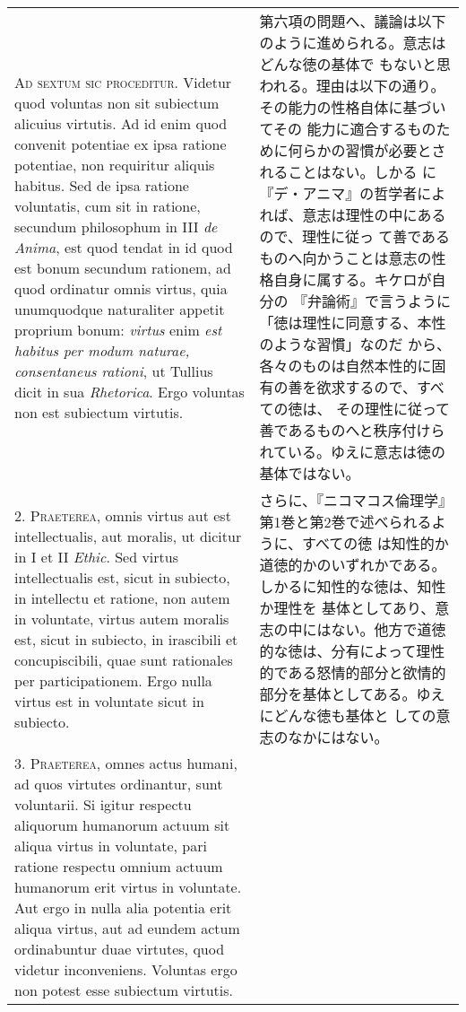 \documentclass[10pt]{jsarticle}
\begin{document}
\begin{longtable}{p{21em}p{21em}}

{\scshape Ad sextum sic proceditur}. Videtur quod voluntas non sit
subiectum alicuius virtutis. Ad id enim quod convenit potentiae ex
ipsa ratione potentiae, non requiritur aliquis habitus. Sed de ipsa
ratione voluntatis, cum sit in ratione, secundum philosophum in III
{\itshape de Anima}, est quod tendat in id quod est bonum secundum
rationem, ad quod ordinatur omnis virtus, quia unumquodque naturaliter
appetit proprium bonum: {\itshape virtus} enim {\itshape est habitus
per modum naturae, consentaneus rationi}, ut Tullius dicit in sua
{\itshape Rhetorica}. Ergo voluntas non est subiectum virtutis.


&

 第六項の問題へ、議論は以下のように進められる。意志はどんな徳の基体で
 もないと思われる。理由は以下の通り。その能力の性格自体に基づいてその
 能力に適合するものために何らかの習慣が必要とされることはない。しかる
 に『デ・アニマ』の哲学者によれば、意志は理性の中にあるので、理性に従っ
 て善であるものへ向かうことは意志の性格自身に属する。キケロが自分の
 『弁論術』で言うように「徳は理性に同意する、本性のような習慣」なのだ
 から、各々のものは自然本性的に固有の善を欲求するので、すべての徳は、
 その理性に従って善であるものへと秩序付けられている。ゆえに意志は徳の
 基体ではない。
 
\\



2. {\scshape Praeterea}, omnis virtus aut est intellectualis, aut
moralis, ut dicitur in I et II {\itshape Ethic}. Sed virtus
intellectualis est, sicut in subiecto, in intellectu et ratione, non
autem in voluntate, virtus autem moralis est, sicut in subiecto, in
irascibili et concupiscibili, quae sunt rationales per
participationem. Ergo nulla virtus est in voluntate sicut in subiecto.


&

さらに、『ニコマコス倫理学』第1巻と第2巻で述べられるように、すべての徳
は知性的か道徳的かのいずれかである。しかるに知性的な徳は、知性か理性を
基体としてあり、意志の中にはない。他方で道徳的な徳は、分有によって理性
的である怒情的部分と欲情的部分を基体としてある。ゆえにどんな徳も基体と
しての意志のなかにはない。
 
\\


3. {\scshape Praeterea}, omnes actus humani, ad quos virtutes
ordinantur, sunt voluntarii. Si igitur respectu aliquorum humanorum
actuum sit aliqua virtus in voluntate, pari ratione respectu omnium
actuum humanorum erit virtus in voluntate. Aut ergo in nulla alia
potentia erit aliqua virtus, aut ad eundem actum ordinabuntur duae
virtutes, quod videtur inconveniens. Voluntas ergo non potest esse
subiectum virtutis.



\end{longtable}
\end{document}
